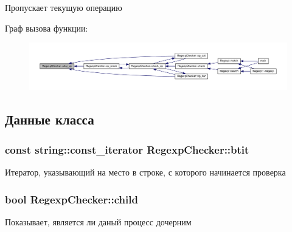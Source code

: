 Пропускает текущую операцию 



Граф вызова функции\+:
\nopagebreak
\begin{figure}[H]
\begin{center}
\leavevmode
\includegraphics[width=350pt]{class_regexp_checker_adf00606a82e27c614122d001f21f9f96_icgraph}
\end{center}
\end{figure}




\subsection{Данные класса}
\subsubsection[{\texorpdfstring{btit}{btit}}]{\setlength{\rightskip}{0pt plus 5cm}const string\+::const\+\_\+iterator Regexp\+Checker\+::btit\hspace{0.3cm}{\ttfamily [private]}}\hypertarget{class_regexp_checker_a54f557b93e0f498422185294726d129c}{}\label{class_regexp_checker_a54f557b93e0f498422185294726d129c}


Итератор, указывающий на место в строке, с которого начинается проверка 

\subsubsection[{\texorpdfstring{child}{child}}]{\setlength{\rightskip}{0pt plus 5cm}bool Regexp\+Checker\+::child\hspace{0.3cm}{\ttfamily [private]}}\hypertarget{class_regexp_checker_a5003c015965ce4177450557c01543812}{}\label{class_regexp_checker_a5003c015965ce4177450557c01543812}


Показывает, является ли даный процесс дочерним 


